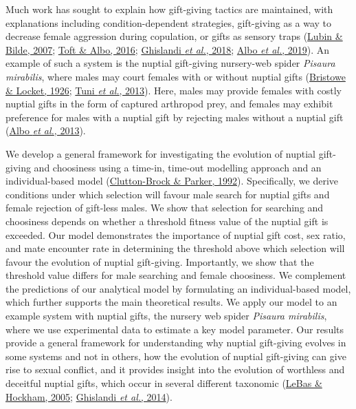 \documentclass[
]{article}
\begin{document}
Much work has sought to explain how gift-giving tactics are maintained,
with explanations including condition-dependent strategies, gift-giving
as a way to decrease female aggression during copulation, or gifts as
sensory traps (\protect\hyperlink{ref-Lubin2007}{Lubin \& Bilde, 2007};
\protect\hyperlink{ref-Toft2016}{Toft \& Albo, 2016};
\protect\hyperlink{ref-Ghislandi2018}{Ghislandi \emph{et al.}, 2018};
\protect\hyperlink{ref-Albo2019}{Albo \emph{et al.}, 2019}). An example
of such a system is the nuptial gift-giving nursery-web spider
\emph{Pisaura mirabilis}, where males may court females with or without
nuptial gifts (\protect\hyperlink{ref-Bristowe1926}{Bristowe \& Locket,
1926}; \protect\hyperlink{ref-Tuni2013a}{Tuni \emph{et al.}, 2013}).
Here, males may provide females with costly nuptial gifts in the form of
captured arthropod prey, and females may exhibit preference for males
with a nuptial gift by rejecting males without a nuptial gift
(\protect\hyperlink{ref-Albo2013}{Albo \emph{et al.}, 2013}).

We develop a general framework for investigating the evolution of
nuptial gift-giving and choosiness using a time-in, time-out modelling
approach and an individual-based model
(\protect\hyperlink{ref-Clutton-Brock1992}{Clutton-Brock \& Parker,
1992}). Specifically, we derive conditions under which selection will
favour male search for nuptial gifts and female rejection of gift-less
males. We show that selection for searching and choosiness depends on
whether a threshold fitness value of the nuptial gift is exceeded. Our
model demonstrates the importance of nuptial gift cost, sex ratio, and
mate encounter rate in determining the threshold above which selection
will favour the evolution of nuptial gift-giving. Importantly, we show
that the threshold value differs for male searching and female
choosiness. We complement the predictions of our analytical model by
formulating an individual-based model, which further supports the main
theoretical results. We apply our model to an example system with
nuptial gifts, the nursery web spider \emph{Pisaura mirabilis}, where we
use experimental data to estimate a key model parameter. Our results
provide a general framework for understanding why nuptial gift-giving
evolves in some systems and not in others, how the evolution of nuptial
gift-giving can give rise to sexual conflict, and it provides insight
into the evolution of worthless and deceitful nuptial gifts, which occur
in several different taxonomic (\protect\hyperlink{ref-LeBas2005}{LeBas
\& Hockham, 2005}; \protect\hyperlink{ref-Ghislandi2014}{Ghislandi
\emph{et al.}, 2014}).
\end{document}
